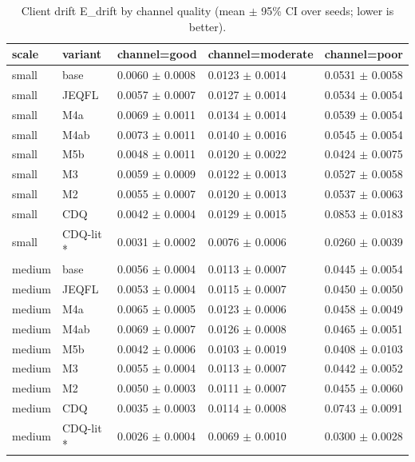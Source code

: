 \begin{table}[t]\centering\footnotesize
\caption{Client drift E\_drift by channel quality (mean $\pm$ 95\% CI over seeds; lower is better).}\label{tab:table3_drift_by_channel}
\begin{tabular}{lllll}
\toprule
scale & variant & channel=good & channel=moderate & channel=poor \\
\midrule
small & base & 0.0060 $\pm$ 0.0008 & 0.0123 $\pm$ 0.0014 & 0.0531 $\pm$ 0.0058 \\
small & JEQFL & 0.0057 $\pm$ 0.0007 & 0.0127 $\pm$ 0.0014 & 0.0534 $\pm$ 0.0054 \\
small & M4a & 0.0069 $\pm$ 0.0011 & 0.0134 $\pm$ 0.0014 & 0.0539 $\pm$ 0.0054 \\
small & M4ab & 0.0073 $\pm$ 0.0011 & 0.0140 $\pm$ 0.0016 & 0.0545 $\pm$ 0.0054 \\
small & M5b & 0.0048 $\pm$ 0.0011 & 0.0120 $\pm$ 0.0022 & 0.0424 $\pm$ 0.0075 \\
small & M3 & 0.0059 $\pm$ 0.0009 & 0.0122 $\pm$ 0.0013 & 0.0527 $\pm$ 0.0058 \\
small & M2 & 0.0055 $\pm$ 0.0007 & 0.0120 $\pm$ 0.0013 & 0.0537 $\pm$ 0.0063 \\
small & CDQ & 0.0042 $\pm$ 0.0004 & 0.0129 $\pm$ 0.0015 & 0.0853 $\pm$ 0.0183 \\
small & CDQ-lit * & 0.0031 $\pm$ 0.0002 & 0.0076 $\pm$ 0.0006 & 0.0260 $\pm$ 0.0039 \\
medium & base & 0.0056 $\pm$ 0.0004 & 0.0113 $\pm$ 0.0007 & 0.0445 $\pm$ 0.0054 \\
medium & JEQFL & 0.0053 $\pm$ 0.0004 & 0.0115 $\pm$ 0.0007 & 0.0450 $\pm$ 0.0050 \\
medium & M4a & 0.0065 $\pm$ 0.0005 & 0.0123 $\pm$ 0.0006 & 0.0458 $\pm$ 0.0049 \\
medium & M4ab & 0.0069 $\pm$ 0.0007 & 0.0126 $\pm$ 0.0008 & 0.0465 $\pm$ 0.0051 \\
medium & M5b & 0.0042 $\pm$ 0.0006 & 0.0103 $\pm$ 0.0019 & 0.0408 $\pm$ 0.0103 \\
medium & M3 & 0.0055 $\pm$ 0.0004 & 0.0113 $\pm$ 0.0007 & 0.0442 $\pm$ 0.0052 \\
medium & M2 & 0.0050 $\pm$ 0.0003 & 0.0111 $\pm$ 0.0007 & 0.0455 $\pm$ 0.0060 \\
medium & CDQ & 0.0035 $\pm$ 0.0003 & 0.0114 $\pm$ 0.0008 & 0.0743 $\pm$ 0.0091 \\
medium & CDQ-lit * & 0.0026 $\pm$ 0.0004 & 0.0069 $\pm$ 0.0010 & 0.0300 $\pm$ 0.0028 \\

\end{tabular}
\end{table}
